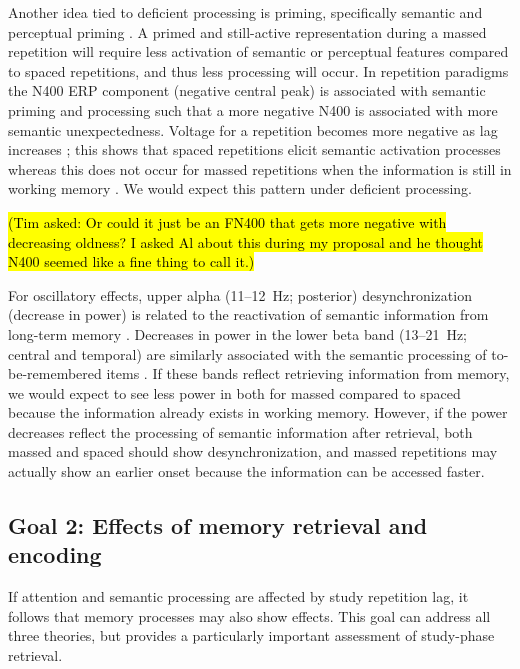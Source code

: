 Another idea tied to deficient processing is priming, specifically semantic \cite{Chal1993} and perceptual priming \cite{MammEtal2002,RussEtal1998}.  A primed and still-active representation during a massed repetition will require less activation of semantic or perceptual features compared to spaced repetitions, and thus less processing will occur.
In repetition paradigms the N400 ERP component (negative central peak) is associated with semantic priming and processing \cite{OlicEtal2000,VanSEtal2007} such that a more negative N400 is associated with more semantic unexpectedness.  Voltage for a repetition becomes more negative as lag increases \cite{KimEtal2001}; this shows that spaced repetitions elicit semantic activation processes whereas this does not occur for massed repetitions when the information is still in working memory \cite{VanSEtal2007}.  We would expect this pattern under deficient processing.

\hl{(Tim asked: Or could it just be an FN400 that gets more negative with decreasing oldness? I asked Al about this during my proposal and he thought N400 seemed like a fine thing to call it.)}

For oscillatory effects, upper alpha (11--12~Hz; posterior) desynchronization (decrease in power) is related to the reactivation of semantic information from long-term memory \cite{Klim1999,KlimEtal2005}.  Decreases in power in the lower beta band (13--21~Hz; central and temporal) are similarly associated with the semantic processing of to-be-remembered items \cite{FellEtal2013,HansEtal2012,HansEtal2011a}.  If these bands reflect retrieving information from memory, we would expect to see less power in both for massed compared to spaced because the information already exists in working memory.  However, if the power decreases reflect the processing of semantic information after retrieval, both massed and spaced should show desynchronization, and massed repetitions may actually show an earlier onset because the information can be accessed faster.



\subsection{Goal 2: Effects of memory retrieval and encoding}

If attention and semantic processing are affected by study repetition lag, it follows that memory processes may also show effects.  This goal
can address all three theories, but provides a particularly important assessment of study-phase retrieval.


